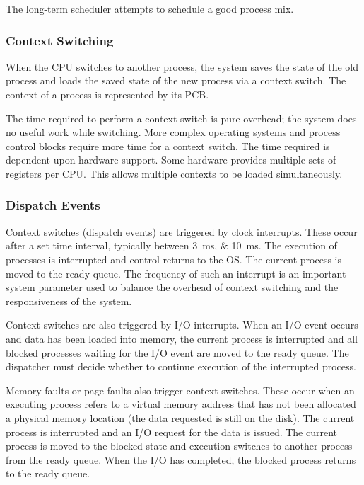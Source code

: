 The long-term scheduler attempts to schedule a good process mix.

\subsubsection{Context Switching}

When the CPU switches to another process, the system saves the state of the old process and loads the saved state of the new process via a context switch.
The context of a process is represented by its PCB.

The time required to perform a context switch is pure overhead; the system does no useful work while switching.
More complex operating systems and process control blocks require more time for a context switch.
The time required is dependent upon hardware support.
Some hardware provides multiple sets of registers per CPU\@.
This allows multiple contexts to be loaded simultaneously.

\subsubsection{Dispatch Events}

Context switches (dispatch events) are triggered by clock interrupts.
These occur after a set time interval, typically between \SIlist{3;10}{\milli\second}.
The execution of processes is interrupted and control returns to the OS\@.
The current process is moved to the ready queue.
The frequency of such an interrupt is an important system parameter used to balance the overhead of context switching and the responsiveness of the system.

Context switches are also triggered by I/O interrupts.
When an I/O event occurs and data has been loaded into memory, the current process is interrupted and all blocked processes waiting for the I/O event are moved to the ready queue.
The dispatcher must decide whether to continue execution of the interrupted process.

Memory faults or page faults also trigger context switches.
These occur when an executing process refers to a virtual memory address that has not been allocated a physical memory location (the data requested is still on the disk).
The current process is interrupted and an I/O request for the data is issued.
The current process is moved to the blocked state and execution switches to another process from the ready queue.
When the I/O has completed, the blocked process returns to the ready queue.

